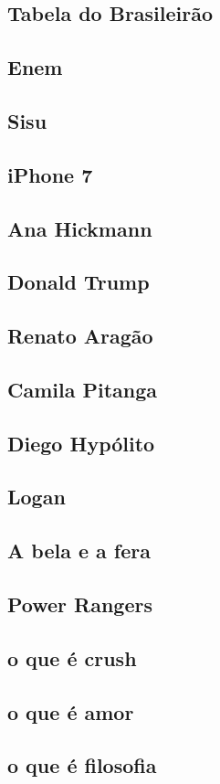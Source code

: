 \documentclass{article}
\begin{document}
\subsection{Tabela do Brasileirão}
\subsection{Enem}
\subsection{Sisu}
\subsection{iPhone 7}
\subsection{Ana Hickmann}
\subsection{Donald Trump}
\subsection{Renato Aragão}
\subsection{Camila Pitanga}
\subsection{Diego Hypólito}
\subsection{Logan}
\subsection{A bela e a fera}
\subsection{Power Rangers}
\subsection{o que é crush}
\subsection{o que é amor}
\subsection{o que é filosofia}
\end{document}
